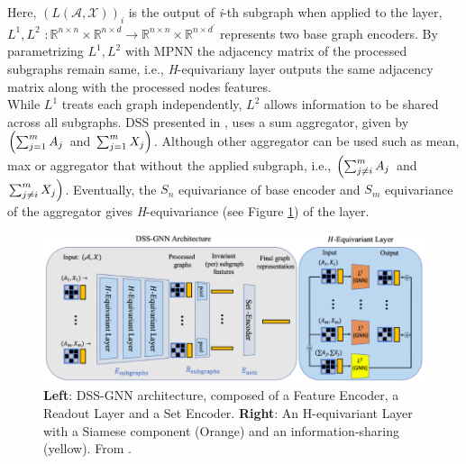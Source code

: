 \documentclass[11pt, dvipsnames, DIV=12]{scrreprt}
\let\originalleft\left
\let\originalright\right
\renewcommand{\left}{\mathopen{}\mathclose\bgroup\originalleft}
\renewcommand{\right}{\aftergroup\egroup\originalright}
\theoremstyle{definition}
\begin{document}
Here, $(L(\mathcal{A}, \mathcal{X}))_i$ is the output of \textit{i}-th subgraph when applied to the layer, $L^1, L^2$ $: \mathbb{R}^{n \times n} \times \mathbb{R}^{n \times d} \rightarrow \mathbb{R}^{n \times n} \times \mathbb{R}^{n \times d^{\prime}}$ represents two base graph encoders. By parametrizing $L^1, L^2$ with MPNN the adjacency matrix of the processed subgraphs remain same, i.e., \textit{H}-equivariany layer outputs the same adjacency matrix along with the processed nodes features.\\
While $L^1$ treats each graph independently, $L^2$ allows information to be shared across all subgraphs. DSS presented in \citep{haggai_symlearning_2020}, uses a sum aggregator, given by 
$\left(\sum_{j=1}^m A_j\right.$ and $\left.\sum_{j=1}^m X_j\right)$. Although other aggregator can be used such as mean, max or aggregator that without the applied subgraph, i.e., $\left(\sum_{j \neq i}^m A_j\right.$ and $\left.\sum_{j \neq i}^m X_j\right)$. Eventually, the \textit{$S_n$} equivariance of base encoder and \textit{$S_m$} equivariance of the aggregator gives \textit{H}-equivariance (see Figure \ref{fig:h_equiv_layer}) of the layer. 
\begin{figure}
    \centering
    \includegraphics[width=.90\textwidth]{figures/Hequivlayer.png}
    \caption{\textbf{Left}: DSS-GNN architecture, composed of a Feature Encoder, a Readout Layer and a Set Encoder. \textbf{Right}: An H-equivariant Layer with  a Siamese component (Orange) and an information-sharing (yellow). From \cite{beatrice_esan_2021}.}
    \label{fig:h_equiv_layer}
\end{figure}
\end{document}
